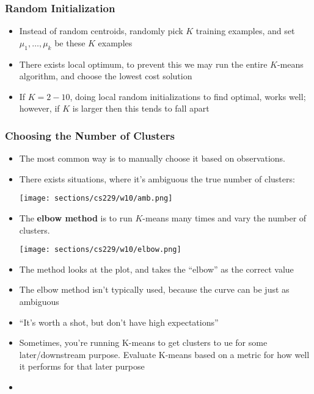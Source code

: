 \subsubsection{Random Initialization}
\begin{itemize}[--]
	\item Instead of random centroids, randomly pick $K$ training examples, and set $\mu_1,\ldots, \mu_k$ be these $K$ examples
	\item There exists local optimum, to prevent this we may run the entire $K$-means algorithm, and choose the lowest cost solution
	\item If $K=2-10$, doing local random initializations to find optimal, works well; however, if $K$ is larger then this tends to fall apart
\end{itemize}

\subsubsection{Choosing the Number of Clusters}
\begin{itemize}[--]
	\item The most common way is to manually choose it based on observations.
	\item There exists situations, where it's ambiguous the true number of clusters:
	\begin{center}
		\texttt{[image: sections/cs229/w10/amb.png]}
	\end{center}

	\item The \textbf{elbow method} is to run $K$-means many times and vary the number of clusters.
	\begin{center}
		\texttt{[image: sections/cs229/w10/elbow.png]}
	\end{center}

	\item The method looks at the plot, and takes the ``elbow'' as the correct value
	\item The elbow method isn't typically used, because the curve can be just as ambiguous
	\item ``It's worth a shot, but don't have high expectations''
	\item Sometimes, you're running K-means to get clusters to ue for some later/downstream purpose. Evaluate K-means based on a metric for how well it performs for that later purpose
	\item 

\end{itemize}